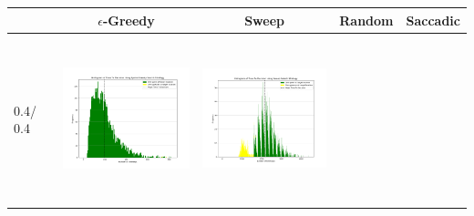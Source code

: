 \begin{landscape}
\begin{table}[h!]
  \centering
  \begin{tabular}{ | m{8mm} | c | c | c | c |}
    \hline
    & $\epsilon$-Greedy & Sweep & Random & Saccadic \\
    \hline
    0.4/ 0.4 &
    \begin{minipage}[c][48mm][c]{48mm}
      \includegraphics[width=48mm, height=48mm]{Chapters/MultiAgentTargetDetection/Figs/Histograms/MiscalibratedSensor/4-4/4-4EpsilonGreedyHistogram.png}
    \end{minipage}
    &
    \begin{minipage}[c][48mm][c]{48mm}
      \includegraphics[width=48mm, height=48mm]{Chapters/MultiAgentTargetDetection/Figs/Histograms/MiscalibratedSensor/4-4/4-4SweepHistogram.png}


\end{minipage}
\end{tabular}
\end{table}
\end{landscape}
